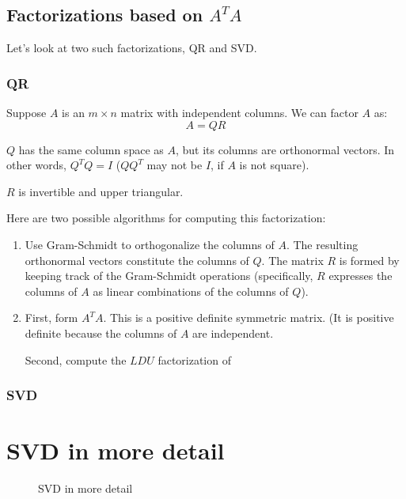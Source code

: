 \subsection{Factorizations based on $A^TA$}

Let's look at two such factorizations, QR and SVD.

\subsubsection{QR}

Suppose $A$ is an $m \times n$ matrix with independent columns. We can factor $A$ as:
\[
    A = QR \tag*{$Q$ is $m \times n$, $R$ is $n \times n$}
\]

$Q$ has the same column space as $A$, but its columns are orthonormal vectors. In other words, $Q^TQ = I$ ($QQ^T$ may not be $I$, if $A$ is not square). 

$R$ is invertible and upper triangular. 

Here are two possible algorithms for computing this factorization:
\begin{enumerate}
    \item Use Gram-Schmidt to orthogonalize the columns of $A$. The resulting orthonormal vectors constitute the columns of $Q$. The matrix $R$ is formed by keeping track of the Gram-Schmidt operations (specifically, $R$ expresses the columns of $A$ as linear combinations of the columns of $Q$). 
    \item First, form $A^TA$. This is a positive definite symmetric matrix. (It is positive definite because the columns of $A$ are independent. 
    
    Second, compute the $LDU$ factorization of 
\end{enumerate}

\subsubsection{SVD}

\section{SVD in more detail}

\begin{figure}
  \centering
  \label{fig:linear-2}
  \caption{SVD in more detail}
  \resizebox{\columnwidth}{!}{
    
  }
\end{figure}

